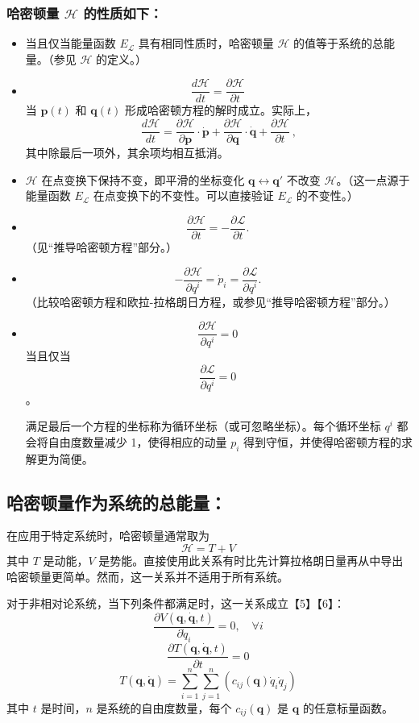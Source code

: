 \subsubsection{哈密顿量 \( \mathcal{H} \) 的性质如下：}
\begin{itemize}
\item 当且仅当能量函数 \( E_{\mathcal{L}} \) 具有相同性质时，哈密顿量 \( \mathcal{H} \) 的值等于系统的总能量。（参见 \( \mathcal{H} \) 的定义。）
\item \[\frac{d\mathcal{H}}{dt} = \frac{\partial \mathcal{H}}{\partial t}~\]当 \( \mathbf{p}(t) \) 和 \( \mathbf{q}(t) \) 形成哈密顿方程的解时成立。实际上，\[\frac{d\mathcal{H}}{dt} = \frac{\partial \mathcal{H}}{\partial \mathbf{p}} \cdot \dot{\mathbf{p}} + \frac{\partial \mathcal{H}}{\partial \mathbf{q}} \cdot \dot{\mathbf{q}} + \frac{\partial \mathcal{H}}{\partial t}~,\]其中除最后一项外，其余项均相互抵消。
\item \( \mathcal{H} \) 在点变换下保持不变，即平滑的坐标变化 \( \mathbf{q} \leftrightarrow \mathbf{q'} \) 不改变 \( \mathcal{H} \)。（这一点源于能量函数 \( E_{\mathcal{L}} \) 在点变换下的不变性。可以直接验证 \( E_{\mathcal{L}} \) 的不变性。）
\item \[\frac{\partial \mathcal{H}}{\partial t} = -\frac{\partial \mathcal{L}}{\partial t}.~\]（见“推导哈密顿方程”部分。）
\item \[-\frac{\partial \mathcal{H}}{\partial q^{i}} = \dot{p}_{i} = \frac{\partial \mathcal{L}}{\partial q^{i}}.~\]（比较哈密顿方程和欧拉-拉格朗日方程，或参见“推导哈密顿方程”部分。）
\item \[\frac{\partial \mathcal{H}}{\partial q^{i}} = 0~\]当且仅当\[\frac{\partial \mathcal{L}}{\partial q^{i}} = 0~\]。

满足最后一个方程的坐标称为循环坐标（或可忽略坐标）。每个循环坐标 \( q^{i} \) 都会将自由度数量减少 1，使得相应的动量 \( p_{i} \) 得到守恒，并使得哈密顿方程的求解更为简便。
\end{itemize}
\subsection{哈密顿量作为系统的总能量：}

在应用于特定系统时，哈密顿量通常取为
\[
\mathcal{H} = T + V~
\]
其中 \( T \) 是动能，\( V \) 是势能。直接使用此关系有时比先计算拉格朗日量再从中导出哈密顿量更简单。然而，这一关系并不适用于所有系统。

对于非相对论系统，当下列条件都满足时，这一关系成立【5】【6】：
\[
\frac{\partial V(\mathbf{q}, \mathbf{\dot{q}}, t)}{\partial \dot{q}_i} = 0,\quad \forall i~
\]
\[
\frac{\partial T(\mathbf{q}, \mathbf{\dot{q}}, t)}{\partial t} = 0~
\]
\[
T(\mathbf{q}, \mathbf{\dot{q}}) = \sum_{i=1}^{n}\sum_{j=1}^{n} \left( c_{ij}(\mathbf{q}) \dot{q}_i \dot{q}_j \right)~
\]
其中 \( t \) 是时间，\( n \) 是系统的自由度数量，每个 \( c_{ij}(\mathbf{q}) \) 是 \( \mathbf{q} \) 的任意标量函数。

